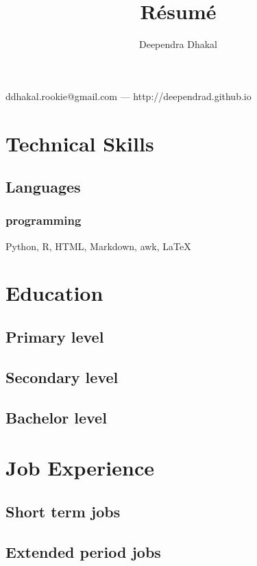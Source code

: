 \documentclass{article}
\makeatletter
\renewcommand{\maketitle} %
{
\begin{center}
{\huge\bfseries
\theauthor}

\vspace{0.25em}

ddhakal.rookie@gmail.com --- http://deependrad.github.io

\end{center}
}
\makeatother
\begin{document}
\title{R\'esum\'e}
\author{Deependra Dhakal}

\maketitle

\section{Technical Skills}

\subsection{Languages}

\subsubsection{programming}

Python, R, HTML, Markdown, awk, \LaTeX

\section{Education}

\subsection{Primary level}

\subsection{Secondary level}

\subsection{Bachelor level}


\section{Job Experience}

\subsection{Short term jobs}

\subsection{Extended period jobs}
\end{document}
